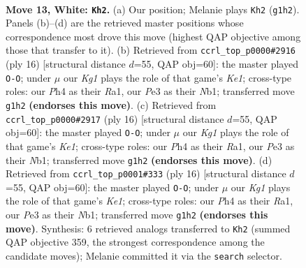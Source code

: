\documentclass[11pt]{article}
\begin{document}
\clearpage

\begin{figure}[p]\centering
\begin{subfigure}{0.46\textwidth}\centering
\resizebox{\linewidth}{!}{%
\newchessgame
\chessboard[
  setfen={1rbq1rk1/ppn1npbp/6p1/2p1p3/7P/3PP1P1/PP3PB1/RNBQNRK1 w - - 3 13},
  showmover=false,
  pgfstyle=straightmove, color=movearrow, markmove={g1-h2}
]}
\caption{}
\end{subfigure}\hfill
\begin{subfigure}{0.46\textwidth}\centering
\resizebox{\linewidth}{!}{%
\newchessgame
\chessboard[
  setfen={rnbq1rk1/pp2ppbp/1n4p1/2pP4/4P3/6P1/PP2NPBP/RNBQK2R w KQ - 1 9},
  showmover=false,
  pgfstyle=straightmove, color=movearrow, markmove={e1-g1}
]}
\caption{}
\end{subfigure}
\\[4pt]
\begin{subfigure}{0.46\textwidth}\centering
\resizebox{\linewidth}{!}{%
\newchessgame
\chessboard[
  setfen={rnbq1rk1/pp2ppbp/1n4p1/2pP4/4P3/6P1/PP2NPBP/RNBQK2R w KQ - 1 9},
  showmover=false,
  pgfstyle=straightmove, color=movearrow, markmove={e1-g1}
]}
\caption{}
\end{subfigure}\hfill
\begin{subfigure}{0.46\textwidth}\centering
\resizebox{\linewidth}{!}{%
\newchessgame
\chessboard[
  setfen={rnbq1rk1/pp2ppbp/1n4p1/2pP4/4P3/6P1/PP2NPBP/RNBQK2R w KQ - 1 9},
  showmover=false,
  pgfstyle=straightmove, color=movearrow, markmove={e1-g1}
]}
\caption{}
\end{subfigure}
\caption{\textbf{Move 13, White: \texttt{Kh2}.} (a) Our position; Melanie plays \texttt{Kh2} (\texttt{g1h2}). Panels (b)--(d) are the retrieved master positions whose correspondence most drove this move (highest QAP objective among those that transfer to it). (b) Retrieved from \texttt{ccrl\_top\_p0000\#2916} (ply 16) [structural distance $d$=55, QAP obj=60]: the master played \texttt{O-O}; under $\mu$ our \emph{Kg1} plays the role of that game's \emph{Ke1}; cross-type roles: our \emph{P}h4 as their \emph{R}a1, our \emph{P}e3 as their \emph{N}b1; transferred move \texttt{g1h2} \textbf{(endorses this move)}. (c) Retrieved from \texttt{ccrl\_top\_p0000\#2917} (ply 16) [structural distance $d$=55, QAP obj=60]: the master played \texttt{O-O}; under $\mu$ our \emph{Kg1} plays the role of that game's \emph{Ke1}; cross-type roles: our \emph{P}h4 as their \emph{R}a1, our \emph{P}e3 as their \emph{N}b1; transferred move \texttt{g1h2} \textbf{(endorses this move)}. (d) Retrieved from \texttt{ccrl\_top\_p0001\#333} (ply 16) [structural distance $d$=55, QAP obj=60]: the master played \texttt{O-O}; under $\mu$ our \emph{Kg1} plays the role of that game's \emph{Ke1}; cross-type roles: our \emph{P}h4 as their \emph{R}a1, our \emph{P}e3 as their \emph{N}b1; transferred move \texttt{g1h2} \textbf{(endorses this move)}. Synthesis: 6 retrieved analogs transferred to \texttt{Kh2} (summed QAP objective 359, the strongest correspondence among the candidate moves); Melanie committed it via the \texttt{search} selector.}
\label{fig:thought-m24}
\end{figure}
\end{document}
